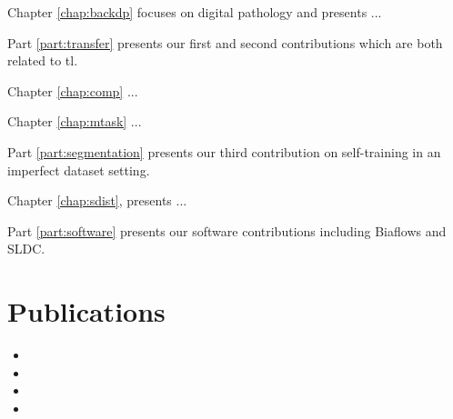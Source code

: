 Chapter \ref{chap:backdp} focuses on digital pathology and presents ...

Part \ref{part:transfer} presents our first and second contributions which are both related to \acrlong{tl}. 

Chapter \ref{chap:comp} ...

Chapter \ref{chap:mtask} ...

Part \ref{part:segmentation} presents our third contribution on self-training in an imperfect dataset setting. 

Chapter \ref{chap:sdist}, presents ...

Part \ref{part:software} presents our software contributions including Biaflows and SLDC.

\section{Publications}

\begin{itemize}
  \item {}
  \item {}
  \item {}
  \item {}
\end{itemize}

